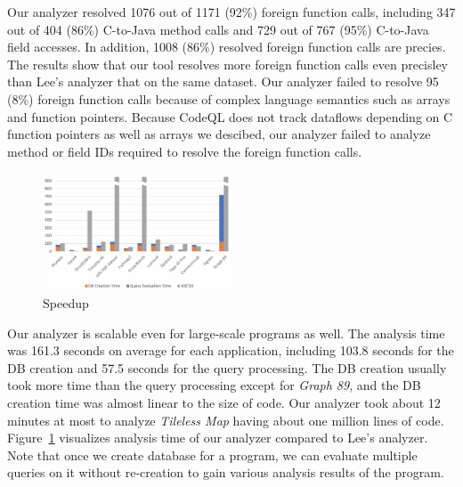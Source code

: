Our analyzer resolved 1076 out of 1171 (92\%) foreign function calls, including
347 out of 404 (86\%) C-to-Java method calls and 729 out of 767 (95\%)
C-to-Java field accesses. In addition, 1008 (86\%) resolved foreign function
calls are precies. The results show that our tool resolves more foreign
function calls even precisley than Lee's analyzer that  on the same
dataset. Our analyzer failed to resolve 95 (8\%) foreign function calls because
of complex language semantics such as arrays and function pointers. Because
CodeQL does not track dataflows depending on C function pointers as well as
arrays we descibed, our analyzer failed to analyze method or field IDs required
to resolve the foreign function calls.

\begin{figure}[t]
  \centering
  \vspace{2mm}
  \includegraphics[width=0.5\textwidth]{img/graph}
  \vspace*{-1.5em}
  \caption{Speedup}
  \label{fig:graph}
\vspace*{-.5em}
\end{figure}

Our analyzer is scalable even for large-scale programs as well. The analysis
time was 161.3 seconds on average for each application, including 103.8 seconds
for the DB creation and 57.5 seconds for the query processing. The DB creation
usually took more time than the query processing except for {\it Graph 89}, and
the DB creation time was almost linear to the size of code. Our analyzer took
about 12 minutes at most to analyze {\it Tileless Map} having about one million
lines of code. Figure~\ref{fig:graph} visualizes analysis time of our analyzer
compared to Lee's analyzer.   Note
that once we create database for a program, we can evaluate multiple queries on
it without re-creation to gain various analysis results of the program.



